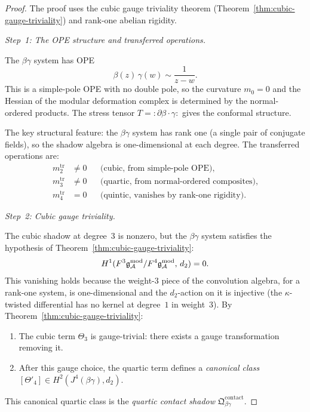 \begin{proof}
The proof uses the cubic gauge triviality theorem
(Theorem~\ref{thm:cubic-gauge-triviality}) and
rank-one abelian rigidity.

\medskip
\emph{Step~1: The OPE structure and transferred operations.}

The $\beta\gamma$ system has OPE
\begin{equation}\label{eq:betagamma-ope-recall}
\beta(z)\,\gamma(w) \sim \frac{1}{z-w}.
\end{equation}
This is a simple-pole OPE with no double pole, so
the curvature $m_0 = 0$ and the Hessian of the
modular deformation complex is determined by the normal-ordered
products. The stress tensor
$T = {:}\partial\beta \cdot \gamma{:}$ gives the
conformal structure.

The key structural feature: the $\beta\gamma$ system
has rank one (a single pair of conjugate fields), so
the shadow algebra is one-dimensional at each degree.
The transferred operations are:
\begin{align*}
m_2^{\mathrm{tr}} &\neq 0
 & &\text{(cubic, from simple-pole OPE)}, \\
m_3^{\mathrm{tr}} &\neq 0
 & &\text{(quartic, from normal-ordered composites)}, \\
m_4^{\mathrm{tr}} &= 0
 & &\text{(quintic, vanishes by rank-one rigidity)}.
\end{align*}

\medskip
\emph{Step~2: Cubic gauge triviality.}

The cubic shadow at degree~$3$ is nonzero, but the
$\beta\gamma$ system satisfies the hypothesis of
Theorem~\ref{thm:cubic-gauge-triviality}:
\begin{equation}\label{eq:betagamma-h1-vanishing}
H^1(F^3 \mathfrak{g}_{\mathcal{A}}^{\mathrm{mod}} / F^4 \mathfrak{g}_{\mathcal{A}}^{\mathrm{mod}},\, d_2) = 0.
\end{equation}
This vanishing holds because the weight-$3$ piece of the
convolution algebra, for a rank-one system, is
one-dimensional and the $d_2$-action on it is injective
(the $\kappa$-twisted differential has no kernel at
degree~$1$ in weight~$3$). By
Theorem~\ref{thm:cubic-gauge-triviality}:
\begin{enumerate}[label=(\alph*)]
\item The cubic term $\Theta_3$ is gauge-trivial:
 there exists a gauge transformation removing it.
\item After this gauge choice, the quartic term
 defines a \emph{canonical class}
 $[\Theta'_4] \in H^2(J^4(\beta\gamma), d_2)$.
\end{enumerate}
This canonical quartic class is the \emph{quartic
contact shadow}
$\mathfrak{Q}^{\mathrm{contact}}_{\beta\gamma}$.


\end{proof}
